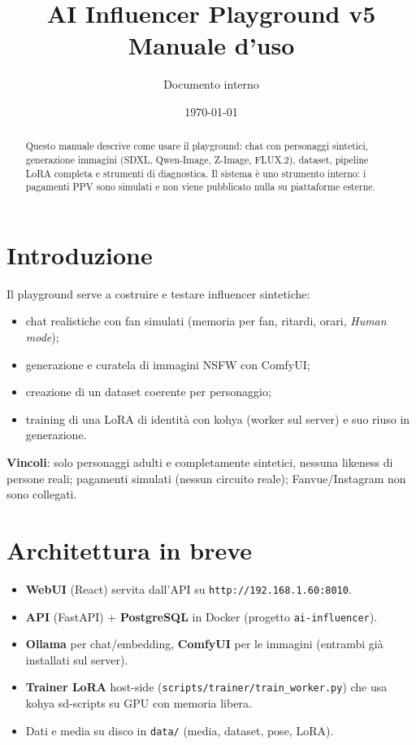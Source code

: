 \documentclass[11pt,a4paper]{article}
\title{\textbf{AI Influencer Playground v5}\\[0.3em]\large Manuale d'uso}
\author{Documento interno}
\date{\today}
\begin{document}
\maketitle
\thispagestyle{fancy}

\begin{abstract}
\noindent Questo manuale descrive come usare il playground: chat con personaggi sintetici, generazione immagini (SDXL, Qwen-Image, Z-Image, FLUX.2), dataset, pipeline LoRA completa e strumenti di diagnostica. Il sistema \`e uno strumento interno: i pagamenti PPV sono simulati e non viene pubblicato nulla su piattaforme esterne.
\end{abstract}

\tableofcontents
\newpage

\section{Introduzione}
Il playground serve a costruire e testare influencer sintetiche:
\begin{itemize}
  \item chat realistiche con fan simulati (memoria per fan, ritardi, orari, \emph{Human mode});
  \item generazione e curatela di immagini NSFW con ComfyUI;
  \item creazione di un dataset coerente per personaggio;
  \item training di una LoRA di identit\`a con kohya (worker sul server) e suo riuso in generazione.
\end{itemize}
\textbf{Vincoli}: solo personaggi adulti e completamente sintetici, nessuna likeness di persone reali; pagamenti simulati (nessun circuito reale); Fanvue/Instagram non sono collegati.

\section{Architettura in breve}
\begin{itemize}
  \item \textbf{WebUI} (React) servita dall'API su \texttt{http://192.168.1.60:8010}.
  \item \textbf{API} (FastAPI) + \textbf{PostgreSQL} in Docker (progetto \texttt{ai-influencer}).
  \item \textbf{Ollama} per chat/embedding, \textbf{ComfyUI} per le immagini (entrambi gi\`a installati sul server).
  \item \textbf{Trainer LoRA} host-side (\texttt{scripts/trainer/train\_worker.py}) che usa kohya sd-scripts su GPU con memoria libera.
  \item Dati e media su disco in \texttt{data/} (media, dataset, pose, LoRA).
\end{itemize}
\end{document}
